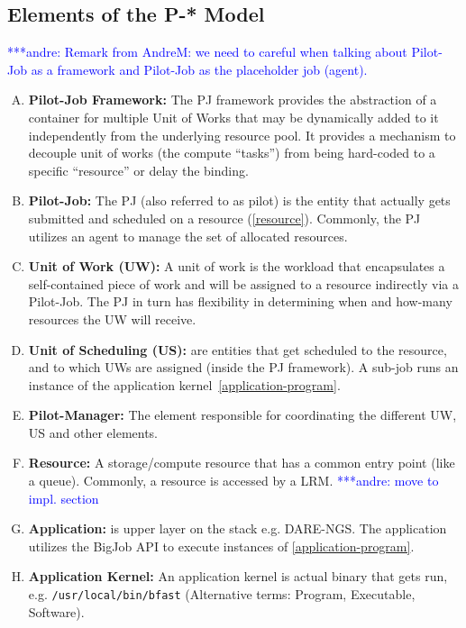 \documentclass[conference,final]{IEEEtran}
\newcommand{\jhanote}[1]{ {\textcolor{red} { ***shantenu: #1 }}}
\newcommand{\alnote}[1]{ {\textcolor{blue} { ***andre: #1 }}}
\newcommand{\alnote}[1]{}
\newcommand{\jhanote}[1]{}
\begin{document}
\subsection{Elements of the P-* Model}

\alnote{Remark from AndreM: we need to careful when talking about
  Pilot-Job as a framework and Pilot-Job as the placeholder job
  (agent).}

\begin{enumerate}[A.]

\item \textbf{Pilot-Job Framework:} The PJ framework provides the
  abstraction of a container for multiple Unit of Works that may be
  dynamically added to it independently from the underlying resource
  pool.  It provides a mechanism to decouple unit of works (the
  compute ``tasks'') from being hard-coded to a specific ``resource''
  or delay the binding.

\item \textbf{Pilot-Job:} The PJ (also referred to as pilot) is the
  entity that actually gets submitted and scheduled on a resource
  (\ref{resource}). Commonly, the PJ utilizes an agent to manage the
  set of allocated resources.

\item \textbf{Unit of Work (UW):} A unit of work is the workload that
  encapsulates a self-contained piece of work and will be assigned to
  a resource indirectly via a Pilot-Job.  The PJ in turn has
  flexibility in determining when and how-many resources the UW will
  receive.

\item \textbf{Unit of Scheduling (US):} are entities 
  that get scheduled to the resource, and to which UWs are assigned
  (inside the PJ framework). A sub-job runs an instance of the application
  kernel~\ref{application-program}.


\item \textbf{Pilot-Manager:} The element responsible for coordinating
  the different UW, US and other elements.

\item \textbf{Resource:} A storage/compute resource that has a common
  entry point (like a queue). Commonly, a resource is accessed by a 
  LRM. \alnote{move to impl. section} \label{resource}

\item \textbf{Application:} is upper layer on the stack
  e.g. DARE-NGS. The application utilizes the BigJob API to execute
  instances of \ref{application-program}. \label{application}

\item \textbf{Application Kernel:} An application kernel is actual
  binary that gets run, e.g. \texttt{/usr/local/bin/bfast}
  (Alternative terms: Program, Executable,
  Software). \label{application-program}
	
\end{enumerate}
\end{document}
